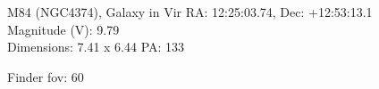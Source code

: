 \begin{block}{M84 (NGC4374), Galaxy in Vir}
    RA: 12:25:03.74, Dec: +12:53:13.1 \\ 
    Magnitude (V): 9.79 \\ 
    Dimensions: 7.41 x 6.44 PA: 133 

    Finder fov: 60 
\end{block}